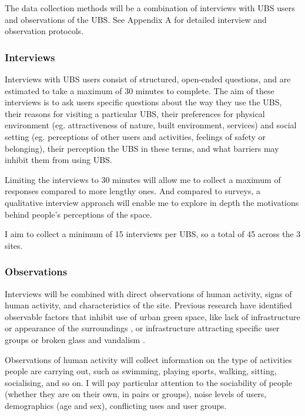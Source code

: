 \documentclass{article}
\begin{document}
The data collection methods will be a combination of interviews with UBS users and observations of the UBS. See Appendix A for detailed interview and observation protocols.

\subsubsection{Interviews}

Interviews with UBS users consist of structured, open-ended questions, and are estimated to take a maximum of 30 minutes to complete. The aim of these interviews is to ask users specific questions about the way they use the UBS, their reasons for visiting a particular UBS, their preferences for physical environment (eg. attractiveness of nature, built environment, services) and  social setting (eg. perceptions of other users and activities, feelings of safety or belonging), their perception the UBS in these terms, and what barriers may inhibit them from using UBS.

Limiting the interviews to 30 minutes will allow me to collect a maximum of responses compared to more lengthy ones. And compared to surveys, a qualitative interview approach will enable me to explore in depth the motivations behind people's perceptions of the space.

I aim to collect a minimum of 15 interviews per UBS, so a total of 45 across the 3 sites.

\subsubsection{Observations}

Interviews will be combined with direct observations of human activity, signs of human activity, and characteristics of the site. Previous research have identified observable factors that inhibit use of urban green space, like lack of infrastructure or appearance of the surroundings \parencite{raymond2016integrating}, or infrastructure attracting specific user groups or broken glass and vandalism \parencite{noel2021social}.

Observations of human activity will collect information on the type of activities people are carrying out, such as swimming, playing sports, walking, sitting, socialising, and so on. I will pay particular attention to the sociability of people (whether they are on their own, in pairs or groups), noise levels of users, demographics (age and sex), conflicting uses and user groups.
\end{document}
